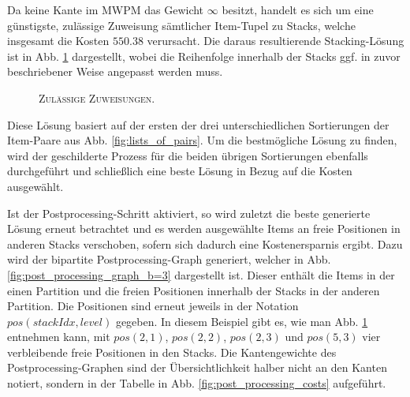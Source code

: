 Da keine Kante im \textsc{MWPM} das Gewicht $\infty$ besitzt, handelt es sich um eine günstigste, zulässige Zuweisung
sämtlicher Item-Tupel zu Stacks, welche insgesamt die Kosten $550.38$ verursacht.
Die daraus resultierende Stacking-Lösung ist in Abb. \ref{fig:valid_solution} dargestellt, wobei die Reihenfolge
innerhalb der Stacks ggf. in zuvor beschriebener Weise angepasst werden muss.
\begin{figure}[H]
  \centering
    \caption{\textsc{Zulässige Zuweisungen.}}
    \label{fig:valid_solution}
\end{figure}

Diese Lösung basiert auf der ersten der drei unterschiedlichen Sortierungen der Item-Paare aus Abb. \ref{fig:lists_of_pairs}.
Um die bestmögliche Lösung zu finden, wird der geschilderte Prozess für die beiden übrigen Sortierungen
ebenfalls durchgeführt und schließlich eine beste Lösung in Bezug auf die Kosten ausgewählt.

Ist der Postprocessing-Schritt aktiviert, so wird zuletzt die beste generierte Lösung erneut betrachtet
und es werden ausgewählte Items an freie Positionen in anderen Stacks verschoben, sofern sich dadurch eine
Kostenersparnis ergibt.
Dazu wird der bipartite Postprocessing-Graph generiert, welcher in Abb. \ref{fig:post_processing_graph_b=3} dargestellt ist.
Dieser enthält die Items in der einen Partition und die freien Positionen innerhalb der Stacks in der anderen Partition.
Die Positionen sind erneut jeweils in der Notation $pos(stackIdx, level)$ gegeben. In diesem Beispiel gibt es,
wie man Abb. \ref{fig:valid_solution} entnehmen kann, mit $pos(2, 1)$, $pos(2, 2)$, $pos(2, 3)$ und $pos(5, 3)$
vier verbleibende freie Positionen in den Stacks. Die Kantengewichte des Postprocessing-Graphen sind der Übersichtlichkeit halber nicht an den Kanten notiert, sondern in der Tabelle in Abb. \ref{fig:post_processing_costs} aufgeführt.


